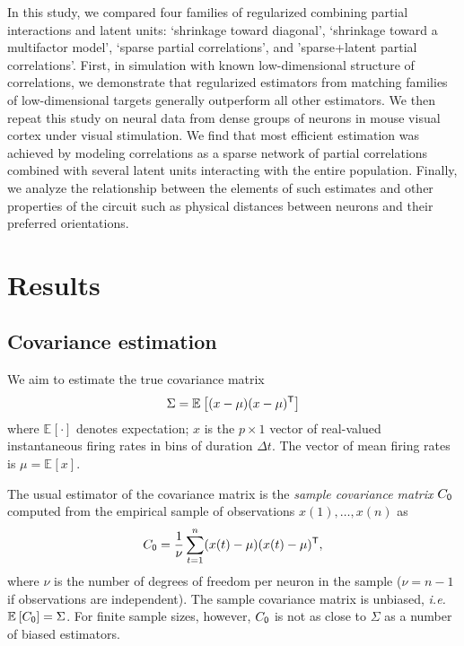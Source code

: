 \documentclass[10pt]{article}
\newcommand{\T}{{\sf T}}
\newcommand{\E}[2][]{\mathbb E_{#1}\left[ #2\right]}    %
\begin{document}
In this study, we compared four families of regularized combining partial interactions and latent units: `shrinkage toward diagonal', `shrinkage toward a multifactor model', `sparse partial correlations', and 'sparse+latent partial correlations'.  First, in simulation with known low-dimensional structure of correlations, we demonstrate that regularized estimators from matching families of low-dimensional targets generally outperform all other estimators. We then repeat this study on neural data from dense groups of neurons in mouse visual cortex under visual stimulation. We find that most efficient estimation was achieved by modeling correlations as a sparse network of partial correlations combined with several latent units interacting with the entire population. Finally, we analyze the relationship between the elements of such estimates and other properties of the circuit such as physical distances between neurons and their preferred orientations. 


\section*{Results}

\subsection*{Covariance estimation}
We aim to estimate the true covariance matrix 
\begin{equation}\label{eq:true-covariance}
\Sigma = \E{(x-\mu)(x-\mu)^\T}
\end{equation}
where $\E{\cdot}$ denotes expectation; $x$ is the $p\times 1$ vector of real-valued instantaneous firing rates in bins of duration $\Delta t$. The vector of mean firing rates is $\mu = \E{x}$.  

The usual estimator of the covariance matrix is the \emph{sample covariance matrix} $C_{\sf 0}$ computed from the empirical sample of observations $x(1),\ldots,x(n)$ as
\begin{equation}
C_{\sf 0} = \frac 1 \nu \sum\limits_{t=1}^n (x(t)-\mu)(x(t)-\mu)^\T, 
\end{equation}
where $\nu$ is the number of degrees of freedom per neuron in the sample ($\nu=n-1$ if observations are independent).  
The sample covariance matrix is unbiased, \emph{i.e.} $\E{C_{\sf 0}}=\Sigma$.
For finite sample sizes, however, $C_{\sf 0}$ is not as close to $\Sigma$ as a number of biased estimators.
\end{document}
